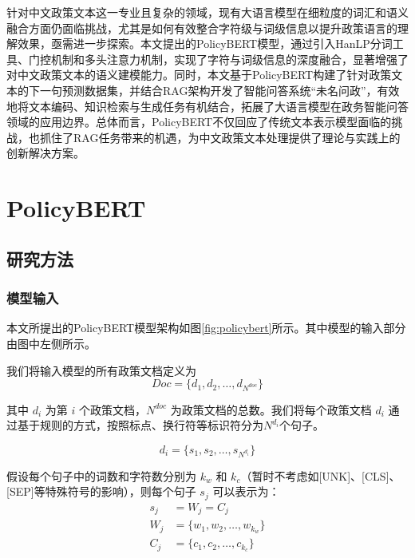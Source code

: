 \documentclass[12pt, a4paper]{ctexart}
\begin{document}
针对中文政策文本这一专业且复杂的领域，现有大语言模型在细粒度的词汇和语义融合方面仍面临挑战，尤其是如何有效整合字符级与词级信息以提升政策语言的理解效果，亟需进一步探索。本文提出的PolicyBERT模型，通过引入HanLP分词工具、门控机制和多头注意力机制，实现了字符与词级信息的深度融合，显著增强了对中文政策文本的语义建模能力。同时，本文基于PolicyBERT构建了针对政策文本的下一句预测数据集，并结合RAG架构开发了智能问答系统“未名问政”，有效地将文本编码、知识检索与生成任务有机结合，拓展了大语言模型在政务智能问答领域的应用边界。总体而言，PolicyBERT不仅回应了传统文本表示模型面临的挑战，也抓住了RAG任务带来的机遇，为中文政策文本处理提供了理论与实践上的创新解决方案。

\section{PolicyBERT}
\subsection{研究方法}

\subsubsection{模型输入}
本文所提出的PolicyBERT模型架构如图\ref{fig:policybert}所示。其中模型的输入部分由图中左侧所示。

我们将输入模型的所有政策文档定义为 
\begin{equation}
    Doc = \{d_1, d_2, \dots, d_{N^{doc}}\} 
\end{equation}

其中 $d_i$ 为第 $i$ 个政策文档，${N^{doc}}$ 为政策文档的总数。我们将每个政策文档 $d_i$ 通过基于规则的方式，按照标点、换行符等标识符分为$N^{d_i}$个句子。 

\begin{equation}
   d_i = \{s_1, s_2, \dots, s_{N^{d_i}}\} 
\end{equation}

假设每个句子中的词数和字符数分别为 $k_w$ 和 $k_c$（暂时不考虑如[UNK]、[CLS]、[SEP]等特殊符号的影响），则每个句子 $s_j$ 可以表示为：
\begin{equation}
    \begin{split}
        s_j &= W_j = C_j \\
        W_j &= \{w_1, w_2, \dots, w_{k_w}\} \\
        C_j &= \{c_1, c_2, \dots, c_{k_c}\}
    \end{split}
\end{equation}
\end{document}
